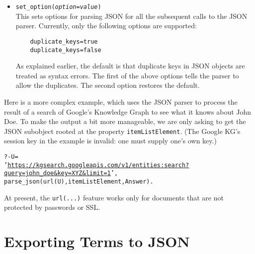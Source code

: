 \begin{itemize}
\item \texttt{set\_option(\emph{option}=\emph{value})}\\
  This sets options for parsing JSON for all the subsequent calls to the
  JSON parser. Currently, only the following options are supported:
\begin{verbatim}
    duplicate_keys=true
    duplicate_keys=false
\end{verbatim}
  As explained earlier, the default is that duplicate keys in JSON objects
  are treated as syntax errors. The first of the above options tells the
  parser to allow the duplicates. The second option restores the default.
\end{itemize}

Here is a more complex example, which uses the JSON parser to
process the result of a search of
Google's Knowledge Graph to see what it knows about John Doe.
To make the output a bit more manageable, we are only asking to get the
JSON subobject rooted at the property \texttt{itemListElement}.
(The Google KG's
session key in the example is invalid: one must supply one's own key.)
\begin{alltt}
?- U =
'\url{https://kgsearch.googleapis.com/v1/entities:search?query=john_doe&key=XYZ&limit=1}',
   parse\_json(url(U), itemListElement, Answer).
\end{alltt}
At present, the \texttt{url(...)} feature works only for documents
that are not protected by passwords or SSL. 

\section{Exporting  Terms to JSON}

